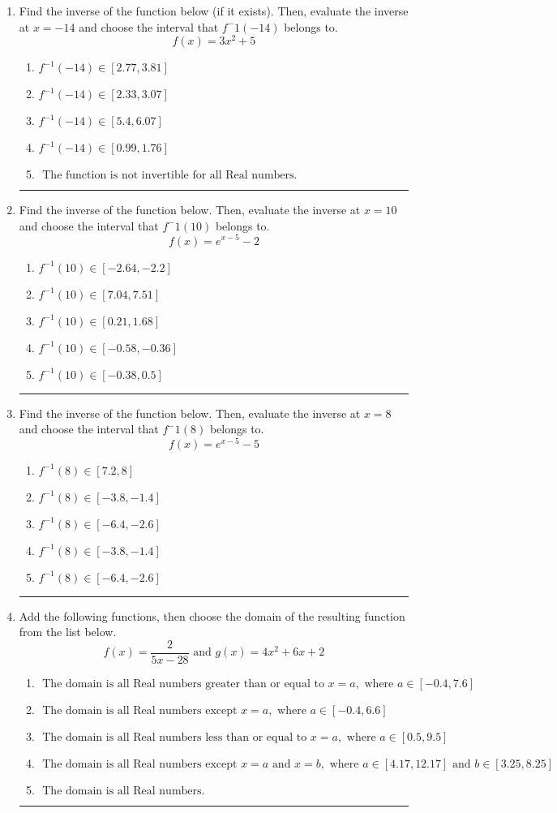 \documentclass[14pt]{extbook}
\newcommand{\litem}[1]{\item#1\hspace*{-1cm}\rule{\textwidth}{0.4pt}}
\begin{document}
\begin{enumerate}
\litem{
Find the inverse of the function below (if it exists). Then, evaluate the inverse at $x = -14$ and choose the interval that $f^-1(-14)$ belongs to.\[ f(x) = 3 x^2 + 5 \]\begin{enumerate}[label=\Alph*.]
\item \( f^{-1}(-14) \in [2.77, 3.81] \)
\item \( f^{-1}(-14) \in [2.33, 3.07] \)
\item \( f^{-1}(-14) \in [5.4, 6.07] \)
\item \( f^{-1}(-14) \in [0.99, 1.76] \)
\item \( \text{ The function is not invertible for all Real numbers. } \)

\end{enumerate} }
\litem{
Find the inverse of the function below. Then, evaluate the inverse at $x = 10$ and choose the interval that $f^-1(10)$ belongs to.\[ f(x) = e^{x-5}-2 \]\begin{enumerate}[label=\Alph*.]
\item \( f^{-1}(10) \in [-2.64, -2.2] \)
\item \( f^{-1}(10) \in [7.04, 7.51] \)
\item \( f^{-1}(10) \in [0.21, 1.68] \)
\item \( f^{-1}(10) \in [-0.58, -0.36] \)
\item \( f^{-1}(10) \in [-0.38, 0.5] \)

\end{enumerate} }
\litem{
Find the inverse of the function below. Then, evaluate the inverse at $x = 8$ and choose the interval that $f^-1(8)$ belongs to.\[ f(x) = e^{x-5}-5 \]\begin{enumerate}[label=\Alph*.]
\item \( f^{-1}(8) \in [7.2, 8] \)
\item \( f^{-1}(8) \in [-3.8, -1.4] \)
\item \( f^{-1}(8) \in [-6.4, -2.6] \)
\item \( f^{-1}(8) \in [-3.8, -1.4] \)
\item \( f^{-1}(8) \in [-6.4, -2.6] \)

\end{enumerate} }
\litem{
Add the following functions, then choose the domain of the resulting function from the list below.\[ f(x) = \frac{2}{5x-28} \text{ and } g(x) = 4x^{2} +6 x + 2 \]\begin{enumerate}[label=\Alph*.]
\item \( \text{ The domain is all Real numbers greater than or equal to } x = a, \text{ where } a \in [-0.4, 7.6] \)
\item \( \text{ The domain is all Real numbers except } x = a, \text{ where } a \in [-0.4, 6.6] \)
\item \( \text{ The domain is all Real numbers less than or equal to } x = a, \text{ where } a \in [0.5, 9.5] \)
\item \( \text{ The domain is all Real numbers except } x = a \text{ and } x = b, \text{ where } a \in [4.17, 12.17] \text{ and } b \in [3.25, 8.25] \)
\item \( \text{ The domain is all Real numbers. } \)


\end{enumerate}}
\end{enumerate}
\end{document}
